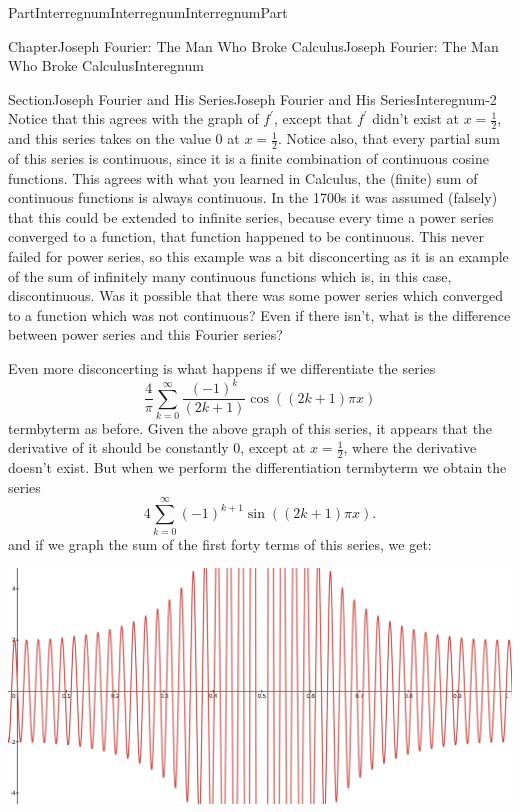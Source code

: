 \documentclass[oneside,10pt,]{book}
\numberwithin{equation}{part}
\begin{document}
\begin{partptx}{Part}{Interregnum}{}{Interregnum}{}{}{InterregnumPart}
\begin{chapterptx}{Chapter}{Joseph Fourier: The Man Who Broke Calculus}{}{Joseph Fourier: The Man Who Broke Calculus}{}{}{Interegnum}
\begin{sectionptx}{Section}{Joseph Fourier and His Series}{}{Joseph Fourier and His Series}{}{}{Interegnum-2}
Notice that this agrees with the graph of \(f^\prime\), except that \(f^\prime\) didn't exist at \(x=\frac{1}{2}\), and this series takes on the value \(0\) at \(x=\frac{1}{2}\). Notice also, that every partial sum of this series is continuous, since it is a finite combination of continuous cosine functions. This agrees with what you learned in Calculus, the (finite) sum of continuous functions is always continuous.  In the 1700s it was assumed (falsely) that this could be extended to infinite series, because every time a power series converged to a function, that function happened to be continuous.  This never failed for power series, so this example was a bit disconcerting as it is an example of the sum of infinitely many continuous functions which is, in this case, discontinuous.  Was it possible that there was some power series which converged to a function which was not continuous?  Even if there isn't, what is the difference between power series and this Fourier series?%
\par
Even more disconcerting is what happens if we  differentiate the series%
\begin{equation*}
\frac{4}{\pi}\sum_{k=0}^\infty\frac{\left(-1\right)^k}{\left(2k+1\right)} \cos\left(\left(2k+1\right)\pi x\right)
\end{equation*}
term\textendash{}by\textendash{}term as before.  Given the above graph of this series, it appears that the derivative of it should be constantly 0, except at \(x=\frac{1}{2}\), where the derivative doesn't exist. But when we perform the differentiation term\textendash{}by\textendash{}term we obtain the series%
\begin{equation*}
4\sum_{k=0}^\infty\left(-1\right)^{k+1}\sin\left(\left(2k+1\right)\pi x\right)\text{.}
\end{equation*}
and if we graph the  sum of  the first forty terms of this series, we get:         %
\begin{image}{0.125}{0.75}{0.125}{}%
\includegraphics[width=\linewidth]{external/images/FourierEx11-1.png}

\end{image}
\end{sectionptx}
\end{chapterptx}
\end{partptx}
\end{document}
